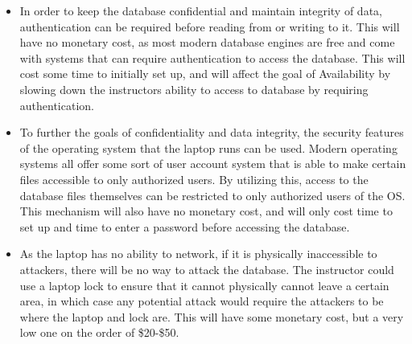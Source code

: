 \documentclass{jhwhw}
\begin{document}
\begin{itemize}
\item In order to keep the database confidential and maintain integrity of data, authentication can be required before reading from or writing to it. This will have no monetary cost, as most modern database engines are free and come with systems that can require authentication to access the database. This will cost some time to initially set up, and will affect the goal of Availability by slowing down the instructors ability to access to database by requiring authentication.
\item To further the goals of confidentiality and data integrity, the security features of the operating system that the laptop runs can be used. Modern operating systems all offer some sort of user account system that is able to make certain files accessible to only authorized users. By utilizing this, access to the database files themselves can be restricted to only authorized users of the OS. This mechanism will also have no monetary cost, and will only cost time to set up and time to enter a password before accessing the database.
\item As the laptop has no ability to network, if it is physically inaccessible to attackers, there will be no way to attack the database. The instructor could use a laptop lock to ensure that it cannot physically cannot leave a certain area, in which case any potential attack would require the attackers to be where the laptop and lock are. This will have some monetary cost, but a very low one on the order of \$20-\$50.
\end{itemize}
\end{document}
